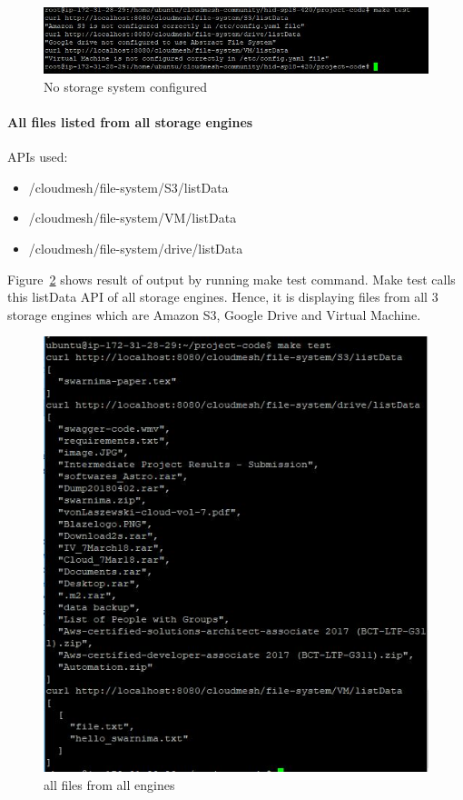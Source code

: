 \begin{figure}[!ht]
        \centering\includegraphics[width=\columnwidth]
        {image/not-configured.JPG}
        \caption{No storage system configured}\label{fig:not-configured}
\end{figure}



\paragraph{All files listed from all storage engines}

APIs used:

\begin{itemize}
    \item /cloudmesh/file-system/S3/listData
    \item /cloudmesh/file-system/VM/listData
    \item /cloudmesh/file-system/drive/listData
\end{itemize}

Figure~\ref{fig:make-test} shows result of output by running make test 
command. Make test calls this listData API of all storage engines. 
Hence, it is displaying files from all 3 storage engines which are 
Amazon S3, Google Drive and Virtual Machine. 

\begin{figure}[!ht]
        \centering\includegraphics[width=\columnwidth]
        {image/make-test.JPG}
        \caption{all files from all engines}\label{fig:make-test}
\end{figure}


